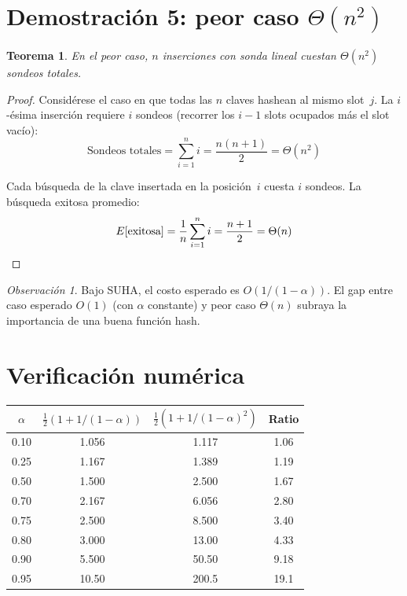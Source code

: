 \documentclass[11pt, letterpaper]{article}
\theoremstyle{definition}
\theoremstyle{plain}
\newtheorem{theorem}{Teorema}[section]
\theoremstyle{remark}
\newtheorem{remark}{Observación}[section]
\begin{document}
\section{Demostración 5: peor caso
  \texorpdfstring{$\Theta(n^2)$}{Theta(n\^2)}}

\begin{theorem}\label{thm:worst}
En el peor caso, $n$ inserciones con sonda lineal cuestan
$\Theta(n^2)$ sondeos totales.
\end{theorem}

\begin{proof}
Considérese el caso en que todas las $n$ claves hashean al mismo
slot~$j$. La $i$-ésima inserción requiere $i$ sondeos (recorrer los
$i{-}1$ slots ocupados más el slot vacío):
\[
  \text{Sondeos totales}
  = \sum_{i=1}^{n} i
  = \frac{n(n+1)}{2}
  = \Theta(n^2)
\]

Cada búsqueda de la clave insertada en la posición~$i$ cuesta $i$
sondeos. La búsqueda exitosa promedio:
\[
  E[\text{exitosa}]
  = \frac{1}{n}\sum_{i=1}^{n} i
  = \frac{n+1}{2}
  = \Theta(n) \qedhere
\]
\end{proof}

\begin{remark}
Bajo SUHA, el costo esperado es $O(1/(1{-}\alpha))$. El gap entre
caso esperado $O(1)$ (con $\alpha$ constante) y peor caso $\Theta(n)$
subraya la importancia de una buena función hash.
\end{remark}

\section{Verificación numérica}

\begin{table}[h]
\centering
\begin{tabular}{cccc}
\toprule
$\alpha$
  & $\frac{1}{2}(1 + 1/(1{-}\alpha))$
  & $\frac{1}{2}(1 + 1/(1{-}\alpha)^2)$
  & Ratio \\
\midrule
0.10 & 1.056  & 1.117   & 1.06 \\
0.25 & 1.167  & 1.389   & 1.19 \\
0.50 & 1.500  & 2.500   & 1.67 \\
0.70 & 2.167  & 6.056   & 2.80 \\
0.75 & 2.500  & 8.500   & 3.40 \\
0.80 & 3.000  & 13.00   & 4.33 \\
0.90 & 5.500  & 50.50   & 9.18 \\
0.95 & 10.50  & 200.5   & 19.1 \\
\bottomrule
\end{tabular}
\end{table}
\end{document}
